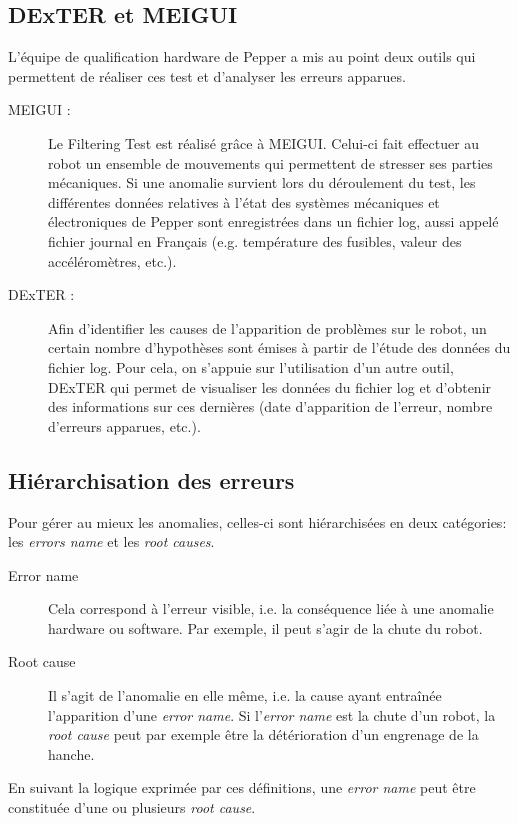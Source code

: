  \subsection{DExTER et MEIGUI}
 \label{Introduction:Expression du besoin:DExTER et MEIGUI}
 L'équipe de qualification hardware de Pepper a mis au point deux outils qui permettent de réaliser ces test et d'analyser les erreurs apparues.
 \begin{description}
 	\item[MEIGUI :] Le Filtering Test est réalisé grâce à MEIGUI. Celui-ci fait effectuer au robot un ensemble de mouvements qui permettent de stresser ses parties mécaniques. Si une anomalie survient lors du déroulement du test, les différentes données relatives à l'état des systèmes mécaniques et électroniques de Pepper sont enregistrées dans un fichier log, aussi appelé fichier journal en Français (e.g. température des fusibles, valeur des accéléromètres, etc.).
 	\item[DExTER :] Afin d'identifier les causes de l'apparition de problèmes sur le robot, un certain nombre d'hypothèses sont émises à partir de l'étude des données du fichier log. Pour cela, on s'appuie sur l'utilisation d'un autre outil, DExTER qui permet de visualiser les données du fichier log et d'obtenir des informations sur ces dernières (date d'apparition de l'erreur, nombre d'erreurs apparues, etc.).
 \end{description}
 
\subsection{Hiérarchisation des erreurs}
\label{Introduction:Expression du besoin:Hiérarchisation des erreurs}
Pour gérer au mieux les anomalies, celles-ci sont hiérarchisées en deux catégories: les \emph{errors name} et les \emph{root causes}.
\begin{description}
	\item [Error name] Cela correspond à l'erreur visible, i.e. la conséquence liée à une anomalie hardware ou software. Par exemple, il peut s'agir de la chute du robot. 
	\item [Root cause] Il s'agit de l'anomalie en elle même, i.e. la cause ayant entraînée l'apparition d'une \emph{error name}. Si l'\emph{error name} est la chute d'un robot, la \emph{root cause} peut par exemple être la détérioration d'un engrenage de la hanche.
\end{description} 

En suivant la logique exprimée par ces définitions, une \emph{error name} peut être constituée d'une ou plusieurs \emph{root cause}. 

